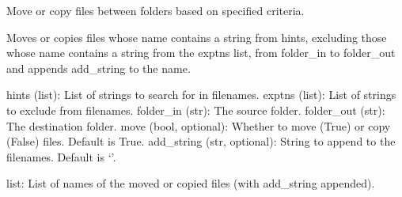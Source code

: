 \documentclass[letterpaper,10pt,english]{sphinxmanual}
\begin{document}

\begin{fulllineitems}
\label{\detokenize{autoapi/unduwave/helpers/file_folder_helpers/index:unduwave.helpers.file_folder_helpers.mv_cp_files}}
\pysigstartsignatures
{}
\pysigstopsignatures
\sphinxAtStartPar
Move or copy files between folders based on specified criteria.

\sphinxAtStartPar
Moves or copies files whose name contains a string from hints,
excluding those whose name contains a string from the exptns list,
from folder\_in to folder\_out and appends add\_string to the name.
\begin{description}
\sphinxAtStartPar
hints (list): List of strings to search for in filenames.
exptns (list): List of strings to exclude from filenames.
folder\_in (str): The source folder.
folder\_out (str): The destination folder.
move (bool, optional): Whether to move (True) or copy (False) files. Default is True.
add\_string (str, optional): String to append to the filenames. Default is ‘’.

\sphinxAtStartPar
list: List of names of the moved or copied files (with add\_string appended).

\end{description}

\end{fulllineitems}

\end{document}
